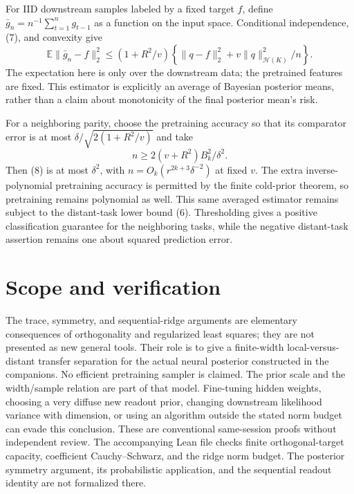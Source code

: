 \documentclass[11pt]{article}
\newcommand{\E}{\mathbb E}\newcommand{\R}{\mathbb R}
\begin{document}
For IID downstream samples labeled by a fixed target $f$, define
$\bar g_n=n^{-1}\sum_{t=1}^n g_{t-1}$ as a function on the input
space. Conditional independence, (7), and convexity give
\[
 \E\|\bar g_n-f\|_2^2
 \le(1+R^2/v)
       \left\{\|q-f\|_2^2+v\|q\|_{\mathcal H(K)}^2/n\right\}.
 \tag{8}
\]
The expectation here is only over the downstream data; the pretrained
features are fixed. This estimator is explicitly an average of Bayesian
posterior means, rather than a claim about monotonicity of the final
posterior mean's risk.

For a neighboring parity, choose the pretraining accuracy so that
its comparator error is at most
$\delta/\sqrt{2(1+R^2/v)}$ and take
\[
 n\ge 2(v+R^2)B_k^2/\delta^2.
\]
Then (8) is at most $\delta^2$, with
$n=O_k(r^{2k+3}\delta^{-2})$ at fixed $v$.
The extra inverse-polynomial pretraining accuracy is permitted by the
finite cold-prior theorem, so pretraining remains polynomial as well.
This same averaged estimator remains subject to the distant-task lower
bound (6). Thresholding gives a positive classification guarantee for
the neighboring tasks, while the negative distant-task assertion remains
one about squared prediction error.

\section*{Scope and verification}
The trace, symmetry, and sequential-ridge arguments are elementary
consequences of orthogonality and regularized least squares; they are
not presented as new general tools. Their role is to give a finite-width
local-versus-distant transfer separation for the actual neural posterior
constructed in the companions. No efficient pretraining sampler is
claimed. The prior scale and the width/sample relation are part of that
model. Fine-tuning hidden weights, choosing a very diffuse new readout
prior, changing downstream likelihood variance with dimension, or using
an algorithm outside the stated norm budget can evade this conclusion.
These are conventional same-session proofs without independent review.
The accompanying Lean file checks finite orthogonal-target capacity,
coefficient Cauchy--Schwarz, and the ridge norm budget. The posterior
symmetry argument, its probabilistic application, and the sequential
readout identity are not formalized there.
\end{document}
